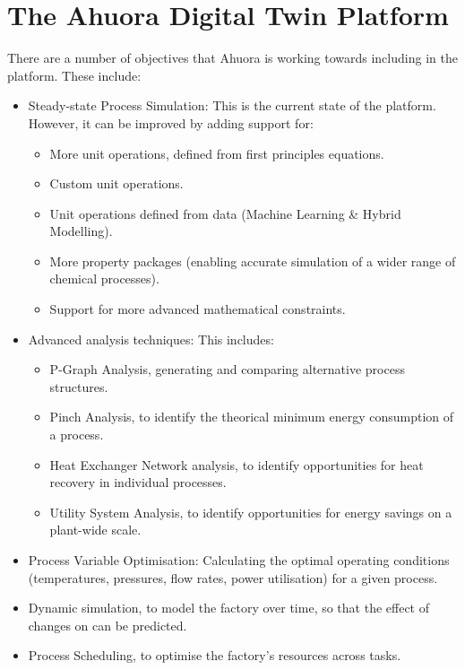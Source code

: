 \section{The Ahuora Digital Twin Platform}

There are a number of objectives that Ahuora is working towards including in the platform. These include:

\begin{itemize}
    \item Steady-state Process Simulation: This is the current state of the platform. However, it can be improved by adding support for:
          \begin{itemize}
              \item More unit operations, defined from first principles equations.
              \item Custom unit operations.
              \item Unit operations defined from data (Machine Learning \& Hybrid Modelling).
              \item More property packages (enabling accurate simulation of a wider range of chemical processes).
              \item Support for more advanced mathematical constraints.
          \end{itemize}
    \item Advanced analysis techniques: This includes:
          \begin{itemize}
              \item P-Graph Analysis, generating and comparing alternative process structures.
              \item Pinch Analysis, to identify the theorical minimum energy consumption of a process.
              \item Heat Exchanger Network analysis, to identify opportunities for heat recovery in individual processes.
              \item Utility System Analysis, to identify opportunities for energy savings on a plant-wide scale.
          \end{itemize}
    \item Process Variable Optimisation: Calculating the optimal operating conditions (temperatures, pressures, flow rates, power utilisation) for a given process.
    \item Dynamic simulation, to model the factory over time, so that the effect of changes on can be predicted.
    \item Process Scheduling, to optimise the factory's resources across tasks.

\end{itemize}
